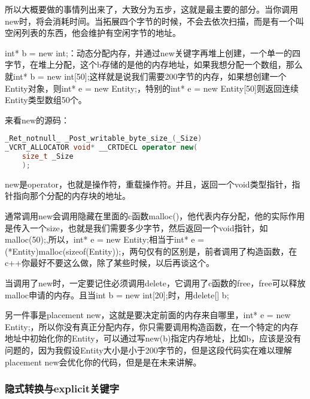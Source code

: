 所以大概要做的事情列出来了，大致分为五步，这就是最主要的部分。当你调用{\ncodestyle new}时，将会消耗时间。当拓展四个字节的时候，不会去依次扫描，而是有一个叫空闲列表的东西，他会维护有空闲字节的地址。

{\ncodestyle int* b = new int;}：动态分配内存，并通过new关键字再堆上创建，一个单一的四字节，在堆上分配，这个{\ncodestyle b}存储的是他的内存地址，如果我想分配一个数组，那么就{\ncodestyle int* b = new int[50];}这样就是说我们需要200字节的内存，如果想创建一个{\ncodestyle Entity}对象，则{\ncodestyle int* e = new Entity;}，特别的{\ncodestyle int* e = new Entity[50]}则返回连续Entity类型数组50个。

来看{\ncodestyle new}的源码：

\begin{lstlisting}[language=c++]
_Ret_notnull_ _Post_writable_byte_size_(_Size)
_VCRT_ALLOCATOR void* __CRTDECL operator new(
    size_t _Size
    );
\end{lstlisting}

{\ncodestyle new}是{\ncodestyle operator}，也就是操作符，重载操作符。并且，返回一个{\ncodestyle void}类型指针，指针指向那个分配的内存块的地址。

通常调用{\ncodestyle new}会调用隐藏在里面的c函数{\ncodestyle malloc()}，他代表内存分配，他的实际作用是传入一个{\ncodestyle size}，也就是我们需要多少字节，然后返回一个{\ncodestyle void}指针，如{\ncodestyle malloc(50);},所以，{\ncodestyle int* e = new Entity;}相当于{\ncodestyle int* e = (*Entity)malloc(sizeof(Entity));}，两句仅有的区别是，前者调用了构造函数，在c++你最好不要这么做，除了某些时候，以后再谈这个。

当调用了{\ncodestyle new}时，一定要记住必须调用{\ncodestyle delete}，它调用了c函数的{\ncodestyle free}，{\ncodestyle free}可以释放{\ncodestyle malloc}申请的内存。且当{\ncodestyle int b = new int[20];}时，用{\ncodestyle delete[] b;}

另一件事是{\ncodestyle placement new}，这就是要决定前面的内存来自哪里，{\ncodestyle int* e = new Entity;}，所以你没有真正分配内存，你只需要调用构造函数，在一个特定的内存地址中初始化你的{\ncodestyle Entity}，可以通过写{\ncodestyle new(b)}指定内存地址，比如{\ncodestyle b}，应该是没有问题的，因为我假设{\ncodestyle Entity}大小是小于200字节的，但是这段代码实在难以理解{\ncodestyle placement new}会优化你的代码，但是是在未来讲解。

\subsubsection{隐式转换与explicit关键字}

